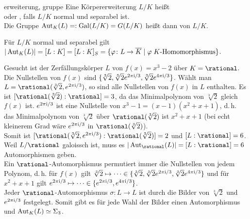 \begin{Def}{erweiterung, gruppe}
    Eine Körpererweiterung $L/K$ heißt\\
     oder
    , falls $L/K$ normal und separabel ist.\\
    Die Gruppe $\operatorname{Aut}_K(L) =: \operatorname{Gal}(L/K) = G(L/K)$
    heißt dann  von $L/K$.
\end{Def}

\begin{Bem}
    Für $L/K$ normal und separabel gilt\\
    $|\operatorname{Aut}_K(L)| = [L:K] = [L:K]_S =
    \{\varphi\colon L \rightarrow \overline{K} \;|\;
    \varphi \;K\text{-Homomorphismus}\}$.
\end{Bem}

\begin{Bsp}
    Gesucht ist der Zerfällungskörper $L$ von
    $f(x) = x^3 - 2$ über $K = \rational$.
    Die Nullstellen von $f(x)$ sind $\{\sqrt[3]{2}, \sqrt[3]{2} e^{2\pi\text{i}/3},
    \sqrt[3]{2} e^{4\pi\text{i}/3}\}$.
    Wählt man $L = \rational(\sqrt[3]{2}, e^{2\pi\i/3})$, so sind alle
    Nullstellen von $f(x)$ in $L$ enthalten.
    Es ist $[\rational(\sqrt[3]{2}) : \rational] = 3$, da das Minimalpolynom
    von $\sqrt[3]{2}$ gleich $f(x)$ ist.
    $e^{2\pi\text{i}/3}$ ist eine Nullstelle von $x^3 - 1 = (x - 1)(x^2 + x + 1)$,
    d.\,h. das Minimalpolynom von $\sqrt[3]{2}$ über $\rational(\sqrt[3]{2})$
    ist $x^2 + x + 1$ (bei echt kleinerem Grad wäre $e^{2\pi\text{i}/3}$ in
    $\rational(\sqrt[3]{2})$).\\
    Somit ist
    $[\rational(\sqrt[3]{2}, e^{2\pi\i/3}) : \rational(\sqrt[3]{2})] = 2$ und
    $[L : \rational] = 6$.
    Weil $L/\rational$ galoissch ist, muss es
    $|\Aut_\rational(L)| = [L:\rational] = 6$ Automorphismen geben.\\
    Ein $\rational$-Automorphismus permutiert immer die Nullstellen von jedem
    Polynom, d.\,h. für $f(x)$ gilt $\sqrt[3]{2} \mapsto \dotsb \in
    \{\sqrt[3]{2}, \sqrt[3]{2} e^{2\pi\text{i}/3}, \sqrt[3]{2} e^{4\pi\text{i}/3}\}$
    und für $x^2 + x + 1$ gilt $e^{2\pi\text{i}/3} \mapsto \dotsb \in
    \{e^{2\pi\text{i}/3}, e^{4\pi\text{i}/3}\}$.\\
    Jeder $\rational$-Automorphismus $\sigma\colon L \rightarrow L$
    ist durch die Bilder von $\sqrt[3]{2}$ und $e^{2\pi\text{i}/3}$ festgelegt.
    Somit gibt es für jede Wahl der Bilder einen Automorphismus und
    $\operatorname{Aut}_K(L) \simeq \Sigma_3$.
\end{Bsp}

